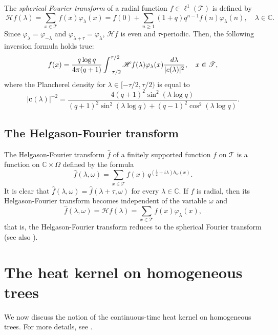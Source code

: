 \documentclass[10pt,a4paper]{amsart}
\renewcommand\mathcal{\mathscr}
\def\int{\intop\nolimits}
\theoremstyle{plain}
\theoremstyle{remark}
\theoremstyle{definition}
\begin{document}
	
	The \textit{spherical Fourier transform} of a radial function $f\in \ell^1(\mathcal{T})$ is defined by
	\[\
	\mathcal{H}f(\lambda)=\sum\limits_{x\in \mathcal{T}}f(x)\varphi_\lambda(x)=f(0)+\sum\limits_{n\geq 1}(1+q)q^{n-1}f(n)\varphi_\lambda(n), \quad  \lambda \in \mathbb{C}.
	\]
	Since $\varphi_\lambda=\varphi_{-\lambda}$ and $\varphi_{\lambda+\tau}=\varphi_{\lambda}$, $\mathcal{H}f$ is even and $\tau$-periodic. Then, the following inversion formula holds true:
	\begin{equation*} 
		f(x)=\frac{q\log q}{4\pi(q+1)}\int_{-\tau /2}^{\tau /2}\mathcal{H}f(\lambda)\varphi_{\lambda}(x)\frac{d \lambda}{|\textbf{c}(\lambda)|^2}, \quad  x\in \mathcal{T},
	\end{equation*}		
	where the Plancherel density for $\lambda \in [-\tau/2, \tau/2)$ is equal to
	\begin{equation}\label{eq:Planchereldens}
		|\mathbf{c}(\lambda)|^{-2}=\frac{4(q+1)^2 \sin ^2(\lambda \log q)}{(q+1)^2 \sin ^2(\lambda \log q)+(q-1)^2 \cos ^2(\lambda \log q)}. 
	\end{equation}	


	
	\subsection{The Helgason-Fourier transform}
	The Helgason-Fourier transform $\widehat{f}$ of a finitely supported function $f$ on $\mathcal{T}$ is a function on $\mathbb{C} \times \Omega$ 
	defined by the formula
	\begin{equation}\label{eq:HFtransform}
	\widehat{f}(\lambda,\omega)=\sum_{x\in \mathcal{T}}f(x)\,q^{(\frac{1}{2}+i\lambda)h_{\omega}(x)}.
\end{equation}
	It is clear that $\widehat{f}(\lambda,\omega)=\widehat{f}(\lambda+\tau,\omega)$ for every $\lambda\in \mathbb{C}$. If $f$ is radial, then its Helgason-Fourier transform becomes independent of the variable $\omega$
	and
	$$\widehat{f}(\lambda,\omega)=\mathcal{H}f(\lambda)=\sum_{x\in \mathcal{T}}f(x)\varphi_{\lambda}(x),$$
	that is, the Helgason-Fourier transform reduces to the spherical Fourier transform (see also \cite[p.401]{CMS0}). 
	
	\section{The heat kernel on homogeneous trees}\label{sec:2}
	We now discuss the notion of the continuous-time heat kernel on homogeneous trees. For more details, see \cite{CMS, MedSe}.
\end{document}
